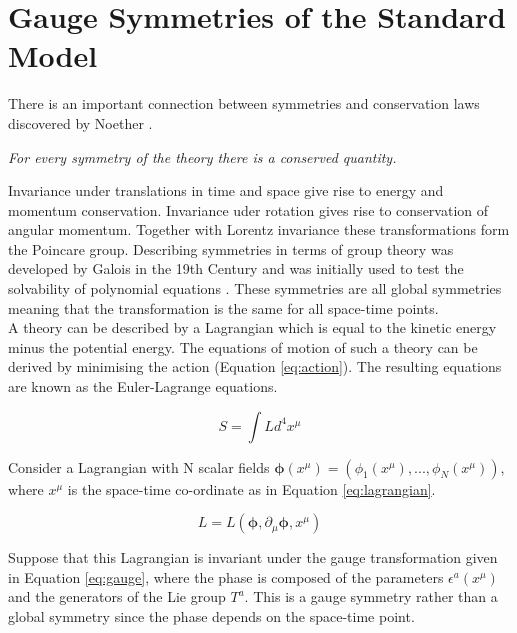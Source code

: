 \section{Gauge Symmetries of the Standard Model}

There is an important connection between symmetries and conservation laws
discovered by Noether \cite{noether}.

\begin{center}
{\it For every symmetry of the theory there is a conserved quantity.} \\
\end{center}

Invariance under translations in time and space give rise to energy and momentum
conservation. Invariance uder rotation gives rise to conservation of angular
momentum. Together with Lorentz invariance these transformations form the
Poincare group. Describing symmetries in terms of group theory was developed by
Galois in the 19th Century and was initially used to test the solvability of 
polynomial equations \cite{galois}. These symmetries are all global symmetries
meaning that the transformation is the same for all space-time points. \\

A theory can be described by a Lagrangian which is equal to the kinetic energy
minus the potential energy. The equations of motion of such a theory can be
derived by minimising the action (Equation \ref{eq:action}). The resulting
equations are known as the Euler-Lagrange equations. 

\begin{equation}
S = \int L d^{4}x^{\mu}
\label{eq:action}
\end{equation}

Consider a Lagrangian with N scalar fields ${\mathbf \phi}(x^{\mu}) =
\left(\phi_{1}(x^{\mu}),...,\phi_{N}(x^{\mu})\right)$, where $x^{\mu}$ is the
space-time co-ordinate as in Equation \ref{eq:lagrangian}.

\begin{equation}
L = L({\mathbf \phi}, \partial_{\mu}{\mathbf \phi}, x^{\mu})
\label{eq:lagrangian}
\end{equation}

Suppose that this Lagrangian is invariant under the gauge transformation given
in Equation \ref{eq:gauge}, where the phase is composed of the parameters 
$\epsilon^{a}\left(x^{\mu}\right)$ and the generators of the Lie group $T^{a}$. 
This is a gauge symmetry rather than a global symmetry since the phase depends 
on the space-time point. 


